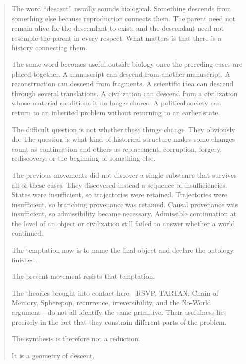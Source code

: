 \documentclass[
  11pt,
  a4paper,
  DIV=12,
  BCOR=0mm,
  parskip=half-
]{scrartcl}
\theoremstyle{definition}
\theoremstyle{plain}
\theoremstyle{remark}
\newenvironment{orientation}
  {%
    \begin{quote}
    \small
    \setlength{\parindent}{1em}
  }
  {%
    \end{quote}
  }
\begin{document}
\begin{orientation}
The word \enquote{descent} usually sounds biological. Something descends from
something else because reproduction connects them. The parent need not remain
alive for the descendant to exist, and the descendant need not resemble the
parent in every respect. What matters is that there is a history connecting
them.

The same word becomes useful outside biology once the preceding cases are
placed together. A manuscript can descend from another manuscript. A
reconstruction can descend from fragments. A scientific idea can descend
through several translations. A civilization can descend from a civilization
whose material conditions it no longer shares. A political society can return
to an inherited problem without returning to an earlier state.

The difficult question is not whether these things change. They obviously do.
The question is what kind of historical structure makes some changes count as
continuation and others as replacement, corruption, forgery, rediscovery, or
the beginning of something else.

The previous movements did not discover a single substance that survives all
of these cases. They discovered instead a sequence of insufficiencies. States
were insufficient, so trajectories were retained. Trajectories were
insufficient, so branching provenance was retained. Causal provenance was
insufficient, so admissibility became necessary. Admissible continuation at
the level of an object or civilization still failed to answer whether a world
continued.

The temptation now is to name the final object and declare the ontology
finished.

The present movement resists that temptation.

The theories brought into contact here---RSVP, TARTAN, Chain of Memory,
Spherepop, recurrence, irreversibility, and the No-World argument---do not all
identify the same primitive. Their usefulness lies precisely in the fact that
they constrain different parts of the problem.

The synthesis is therefore not a reduction.

It is a geometry of descent.
\end{orientation}

\end{document}
